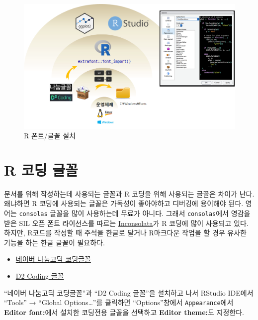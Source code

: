 \documentclass[
]{book}
\providecommand{\tightlist}{%
  \setlength{\itemsep}{0pt}\setlength{\parskip}{0pt}}
\begin{document}
\begin{figure}
\centering
\includegraphics[width=1\textwidth,height=\textheight]{assets/images/font_overview.png}
\caption{R 폰트/글꼴 설치}
\end{figure}

\hypertarget{font-coding}{%
\section{R 코딩 글꼴}\label{font-coding}}

문서를 위해 작성하는데 사용되는 글꼴과 R 코딩을 위해 사용되는 글꼴은
차이가 난다. 왜냐하면 R 코딩에 사용되는 글꼴은 가독성이 좋아야하고
디버깅에 용이해야 된다. 영어는 \texttt{consolas} 글꼴을 많이 사용하는데 무료가
아니다. 그래서 \texttt{consolas}에서 영감을 받은 SIL 오픈 폰트 라이선스를
따르는 \href{https://en.wikipedia.org/wiki/Inconsolata}{Inconsolata}가 R
코딩에 많이 사용되고 있다. 하지만, R코드를 작성할 때 주석을 한글로
달거나 R마크다운 작업을 할 경우 유사한 기능을 하는 한글 글꼴이 필요하다.

\begin{itemize}
\tightlist
\item
  \href{https://github.com/naver/nanumfont/blob/master/README.md}{네이버 나눔고딕 코딩글꼴}
\item
  \href{https://github.com/naver/d2codingfont}{D2 Coding 글꼴}
\end{itemize}

``네이버 나눔고딕 코딩글꼴''과 ``D2 Coding 글꼴''을 설치하고 나서 RStudio
IDE에서 ``Tools'' → ``Global Options\ldots{}''를 클릭하면 ``Options''창에서
\texttt{Appearance}에서 \textbf{Editor font:}에서 설치한 코딩전용 글꼴을 선택하고
\textbf{Editor theme:}도 지정한다.
\end{document}
